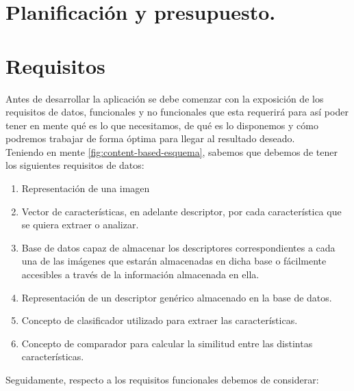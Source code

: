 \chapter{Planificación y presupuesto.}
\chapter{Requisitos}
Antes de desarrollar la aplicación se debe comenzar con la exposición de los requisitos de datos, funcionales y no funcionales que esta requerirá para así poder tener en mente qué es lo que necesitamos, de qué es lo disponemos y cómo podremos trabajar de forma óptima para llegar al resultado deseado.\\

Teniendo en mente \autoref{fig:content-based-esquema}, sabemos que debemos de tener los siguientes requisitos de datos:\\
\begin{enumerate}
\item Representación de una imagen
\item Vector de características, en adelante descriptor, por cada característica que se quiera extraer o analizar.
\item Base de datos capaz de almacenar los descriptores correspondientes a cada una de las imágenes que estarán almacenadas en dicha base o fácilmente accesibles a través de la información almacenada en ella.
\item Representación de un descriptor genérico almacenado en la base de datos.
\item Concepto de clasificador utilizado para extraer las características.
\item Concepto de comparador para calcular la similitud entre las distintas características.
\end{enumerate}
Seguidamente, respecto a los requisitos funcionales debemos de considerar:\\
